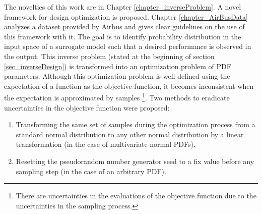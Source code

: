 The novelties of this work are in Chapter \ref{chapter_inverseProblem}.
A novel framework for design optimization is proposed.
Chapter \ref{chapter_AirBusData} analyzes a dataset provided by Airbus and gives clear guidelines on the use of this framework with it.
The goal is to identify probability distribution in the input space of a surrogate model such that a desired performance is observed in the output.
This inverse problem (stated at the beginning of section \ref{sec_inverseDesign}) is transformed into an optimization problem of PDF parameters.
Although this optimization problem is well defined using the expectation of a function as the objective function, it becomes inconsistent when the expectation is approximated by samples 
\footnote{There are uncertainties in the evaluations of the objective function due to the uncertainties in the sampling process.}.
Two methods to eradicate uncertainties in the objective function were proposed: 
\begin{enumerate}
\item Transforming the same set of samples during the optimization process from a standard normal distribution to any other normal distribution by a linear transformation (in the case of multivariate normal PDFs).
\item Resetting the pseudorandom number generator seed to a fix value before any sampling step (in the case of an arbitrary PDF).
\end{enumerate}


